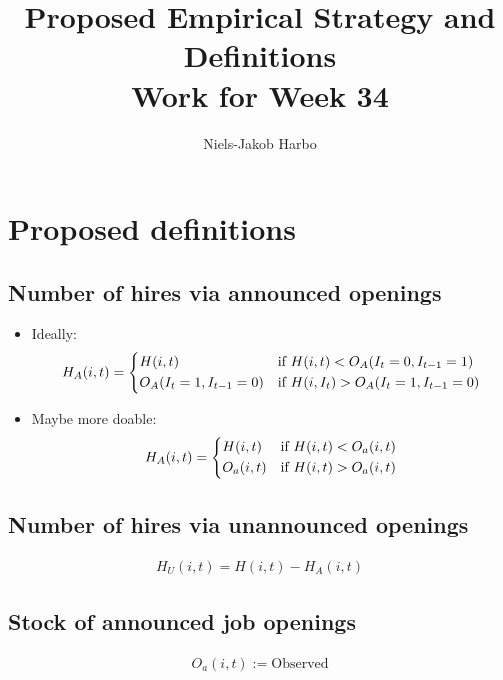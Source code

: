 \documentclass{article}
\title{Proposed Empirical Strategy and Definitions \\ Work for Week 34}
\author{Niels-Jakob Harbo}
\begin{document}
\maketitle

\section{Proposed definitions}

\subsection*{Number of hires via announced openings}

\begin{itemize}
\item Ideally:
\begin{align}
H_A(i,t)=
\begin{dcases}
H(i,t) &\text{if } H(i,t)<O_A (I_t=0, I_{t-1}=1) \\
O_A (I_t=1, I_{t-1}=0) &\text{if } H(i,I_t)>O_A (I_t=1, I_{t-1}=0)
\end{dcases}
\end{align}


\item Maybe more doable:
\begin{align}
H_A(i,t)=
\begin{dcases}
H(i,t)   &\text{if } H(i,t)<O_a(i,t) \\
O_a(i,t) &\text{if } H(i,t)>O_a(i,t) 
\end{dcases}
\end{align}

\end{itemize}

\subsection*{Number of hires via unannounced openings}

\begin{align}
H_U(i,t)=H(i,t)-H_A(i,t)
\end{align}

\subsection*{Stock of announced job openings}

\begin{align}
O_a(i,t):= \text{Observed}
\end{align}
\end{document}
